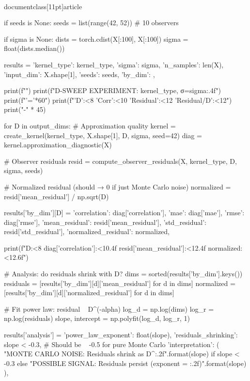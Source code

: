 \\documentclass[11pt]{article}
\begin{document}
\begin{CodeBlock}
    if seeds is None:
        seeds = list(range(42, 52))  # 10 observers
    
    if sigma is None:
        dists = torch.cdist(X[:100], X[:100])
        sigma = float(dists.median())
    
    results = {
        'kernel_type': kernel_type,
        'sigma': sigma,
        'n_samples': len(X),
        'input_dim': X.shape[1],
        'seeds': seeds,
        'by_dim': {},
    }
    
    print(f"")
    print(f"D-SWEEP EXPERIMENT: {kernel_type}, σ={sigma:.4f}")
    print(f"{'='*60}")
    print(f"{'D':<8} {'Corr':<10} {'Residual':<12} {'Residual/D':<12}")
    print("-" * 45)
    
    for D in output_dims:
        # Approximation quality
        kernel = create_kernel(kernel_type, X.shape[1], D, sigma, seed=42)
        diag = kernel.approximation_diagnostic(X)
        
        # Observer residuals
        resid = compute_observer_residuals(X, kernel_type, D, sigma, seeds)
        
        # Normalized residual (should → 0 if just Monte Carlo noise)
        normalized = resid['mean_residual'] / np.sqrt(D)
        
        results['by_dim'][D] = {
            'correlation': diag['correlation'],
            'mae': diag['mae'],
            'rmse': diag['rmse'],
            'mean_residual': resid['mean_residual'],
            'std_residual': resid['std_residual'],
            'normalized_residual': normalized,
        }
        
        print(f"{D:<8} {diag['correlation']:<10.4f} {resid['mean_residual']:<12.4f} {normalized:<12.6f}")
    
    # Analysis: do residuals shrink with D?
    dims = sorted(results['by_dim'].keys())
    residuals = [results['by_dim'][d]['mean_residual'] for d in dims]
    normalized = [results['by_dim'][d]['normalized_residual'] for d in dims]
    
    # Fit power law: residual ~ D^(-alpha)
    log_d = np.log(dims)
    log_r = np.log(residuals)
    slope, intercept = np.polyfit(log_d, log_r, 1)
    
    results['analysis'] = {
        'power_law_exponent': float(slope),
        'residuals_shrinking': slope < -0.3,  # Should be ~ -0.5 for pure Monte Carlo
        'interpretation': (
            "MONTE CARLO NOISE: Residuals shrink as D^{:.2f}".format(slope)
            if slope < -0.3 else
            "POSSIBLE SIGNAL: Residuals persist (exponent = {:.2f})".format(slope)
        ),
    }
    

\end{CodeBlock}
\end{document}
